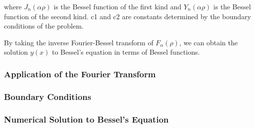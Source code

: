 where \(J_n(\alpha\rho)\) is the Bessel function of the first kind and \(Y_n(\alpha\rho)\) is the Bessel function of the second kind. c1 and c2 are constants determined by the boundary conditions of the problem.

By taking the inverse Fourier-Bessel transform of \(F_\alpha(\rho)\), we can obtain the solution \(y(x)\) to Bessel's equation in terms of Bessel functions.

\subsubsection{Application of the Fourier Transform}

\subsubsection{Boundary Conditions} %

\subsubsection{Numerical Solution to Bessel's Equation}

